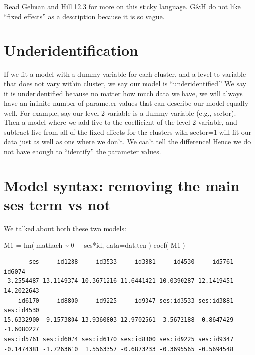 \documentclass[
  letterpaper,
  DIV=11,
  numbers=noendperiod]{scrreprt}
\newenvironment{Shaded}{}{}
\newcommand{\AttributeTok}[1]{\textcolor[rgb]{0.49,0.56,0.16}{#1}}
\newcommand{\DecValTok}[1]{\textcolor[rgb]{0.25,0.63,0.44}{#1}}
\newcommand{\FunctionTok}[1]{\textcolor[rgb]{0.02,0.16,0.49}{#1}}
\newcommand{\NormalTok}[1]{#1}
\newcommand{\OtherTok}[1]{\textcolor[rgb]{0.00,0.44,0.13}{#1}}
\newcommand{\SpecialCharTok}[1]{\textcolor[rgb]{0.25,0.44,0.63}{#1}}
\begin{document}
Read Gelman and Hill 12.3 for more on this sticky language. G\&H do not
like ``fixed effects'' as a description because it is so vague.

\section{Underidentification}\label{underidentification}

If we fit a model with a dummy variable for each cluster, and a level to
variable that does not vary within cluster, we say our model is
``underidentified.'' We say it is underidentified because no matter how
much data we have, we will always have an infinite number of parameter
values that can describe our model equally well. For example, say our
level 2 variable is a dummy variable (e.g., sector). Then a model where
we add five to the coefficient of the level 2 variable, and subtract
five from all of the fixed effects for the clusters with sector=1 will
fit our data just as well as one where we don't. We can't tell the
difference! Hence we do not have enough to ``identify'' the parameter
values.

\section{Model syntax: removing the main ses term vs
not}\label{model-syntax-removing-the-main-ses-term-vs-not}

We talked about both these two models:

\begin{Shaded}
\begin{Highlighting}[]
\NormalTok{M1 }\OtherTok{=} \FunctionTok{lm}\NormalTok{( mathach }\SpecialCharTok{\textasciitilde{}} \DecValTok{0} \SpecialCharTok{+}\NormalTok{ ses}\SpecialCharTok{*}\NormalTok{id, }\AttributeTok{data=}\NormalTok{dat.ten )}
\FunctionTok{coef}\NormalTok{( M1 )}
\end{Highlighting}
\end{Shaded}

\begin{verbatim}
       ses     id1288     id3533     id3881     id4530     id5761     id6074 
 3.2554487 13.1149374 10.3671216 11.6441421 10.0390287 12.1419451 14.2022643 
    id6170     id8800     id9225     id9347 ses:id3533 ses:id3881 ses:id4530 
15.6332900  9.1573804 13.9360803 12.9702661 -3.5672188 -0.8647429 -1.6080227 
ses:id5761 ses:id6074 ses:id6170 ses:id8800 ses:id9225 ses:id9347 
-0.1474381 -1.7263610  1.5563357 -0.6873233 -0.3695565 -0.5694548 
\end{verbatim}
\end{document}
